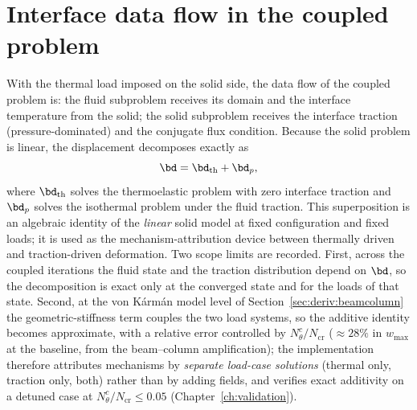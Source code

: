\section{Interface data flow in the coupled problem}
\label{sec:datamodel}
With the thermal load imposed on the solid side, the data flow of the coupled problem is: the fluid
subproblem receives its domain and the interface temperature from the solid; the solid subproblem
receives the interface traction (pressure-dominated) and the conjugate flux condition. Because the
solid problem is linear, the displacement decomposes exactly as
\begin{equation}
\bd=\bd_{\mathrm{th}}+\bd_p,
\label{eq:superposition}
\end{equation}
where $\bd_{\mathrm{th}}$ solves the thermoelastic problem with zero interface traction and
$\bd_p$ solves the isothermal problem under the fluid traction. This superposition is an algebraic
identity of the \emph{linear} solid model at fixed configuration and fixed loads; it is used as
the mechanism-attribution device between thermally driven and traction-driven deformation. Two
scope limits are recorded. First, across the coupled iterations the fluid state and the traction
distribution depend on $\bd$, so the decomposition is exact only at the converged state and for
the loads of that state. Second, at the von K\'arm\'an model level of
Section~\ref{sec:deriv:beamcolumn} the geometric-stiffness term couples the two load systems, so
the additive identity becomes approximate, with a relative error controlled by
$N_\theta^c/N_{\mathrm{cr}}$ ($\approx28\%$ in $w_{\max}$ at the baseline, from the
beam--column amplification); the implementation therefore attributes mechanisms by
\emph{separate load-case solutions} (thermal only, traction only, both) rather than by adding
fields, and verifies exact additivity on a detuned case at $N_\theta^c/N_{\mathrm{cr}}\le0.05$
(Chapter~\ref{ch:validation}).
